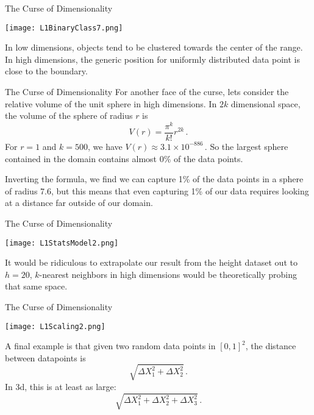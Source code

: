 \documentclass[10pt,handout]{beamer}
\begin{document}
\begin{frame}[fragile]{The Curse of Dimensionality}
   \begin{minipage}[t][0.5\textheight][t]{\textwidth}
    \centering
     \texttt{[image: L1BinaryClass7.png]}
  \end{minipage}
  \vfill
  \begin{minipage}[t][0.3\textheight][t]{\textwidth}
In low dimensions, objects tend to be clustered towards the center of the range. In high dimensions, the generic position for uniformly distributed data point is close to the boundary. 
 \end{minipage}
\end{frame}





\begin{frame}[fragile]{The Curse of Dimensionality}
For another face of the curse, lets consider the relative volume of the unit sphere in high dimensions. In $2k$ dimensional space, the volume of the sphere of radius $r$ is
$$
V(r) = \frac{\pi^k}{k!}r^{2k}\,.
$$\pause
For $r=1$ and $k=500$, we have $V(r) \approx 3.1\times 10^{-886}$\,. So the largest sphere contained in the domain contains almost 0\% of the data points. \pause

Inverting the formula, we find we can capture 1\% of the data points in a sphere of radius 7.6, but this means that even capturing 1\% of our data requires looking at a distance far outside of our domain. 
\end{frame}



\begin{frame}[fragile]{The Curse of Dimensionality}
   \begin{minipage}[t][0.5\textheight][t]{\textwidth}
    \centering
     \texttt{[image: L1StatsModel2.png]}
  \end{minipage}
  \vfill
  \begin{minipage}[t][0.5\textheight][t]{\textwidth}
It would be ridiculous to extrapolate our result from the height dataset out to $h = 20$, $k$-nearest neighbors in high dimensions would be theoretically probing that same space. 
 \end{minipage}
\end{frame}



\begin{frame}[fragile]{The Curse of Dimensionality}
   \begin{minipage}[t][0.5\textheight][t]{\textwidth}
    \centering
     \texttt{[image: L1Scaling2.png]}
  \end{minipage}
  \vfill
  \begin{minipage}[t][0.5\textheight][t]{\textwidth}
A final example is that given two random data points in $[0,1]^2$, the distance between datapoints is 
$$
\sqrt{\Delta X_1^2 + \Delta X_2^2}\,.
$$
In 3d, this is at least as large:
$$
\sqrt{\Delta X_1^2 + \Delta X_2^2 + \Delta X_3^2}\,.
$$
 \end{minipage}
\end{frame}
\end{document}
